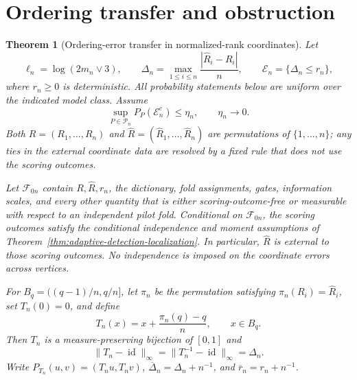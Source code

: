 \documentclass[11pt]{article}
\newtheorem{theorem}{Theorem}[section]
\theoremstyle{definition}
\newcommand{\1}{\mathbf 1}\newcommand{\op}{\operatorname}
\begin{document}
\section{Ordering transfer and obstruction}\label{sec:supp-order}


\begin{theorem}[Ordering-error transfer in normalized-rank coordinates]
\label{thm:ordering-error-transfer}
Let
\[
 \ell_n=\log(2m_n\vee3),\qquad
 \Delta_n=\max_{1\le i\le n}
 \frac{|\widehat R_i-R_i|}{n},\qquad
 \mathcal E_n=\{\Delta_n\le r_n\},
\]
where $r_n\ge0$ is deterministic.  All probability statements below
are uniform over the indicated model class.  Assume
\begin{equation}
 \sup_{P\in\mathscr P_n}P_P(\mathcal E_n^c)
 \le \eta_n,\qquad \eta_n\to0.
 \label{eq:T4-coverage}
\end{equation}
Both $R=(R_1,\ldots,R_n)$ and
$\widehat R=(\widehat R_1,\ldots,\widehat R_n)$ are permutations of
$\{1,\ldots,n\}$; any ties in the external coordinate data are
resolved by a fixed rule that does not use the scoring outcomes.

Let $\mathcal F_{0n}$ contain $R,\widehat R,r_n$, the dictionary,
fold assignments, gates, information scales, and every other quantity
that is either scoring-outcome-free or measurable with respect to an
independent pilot fold.  Conditional on
$\mathcal F_{0n}$, the scoring outcomes satisfy the conditional
independence and moment assumptions of
Theorem~\ref{thm:adaptive-detection-localization}.  In particular,
$\widehat R$ is external to those scoring outcomes.  No independence
is imposed on the coordinate errors across vertices.

For $B_q=((q-1)/n,q/n]$, let $\pi_n$ be the permutation satisfying
$\pi_n(R_i)=\widehat R_i$, set $T_n(0)=0$, and define
\begin{equation}
 T_n(x)=x+\frac{\pi_n(q)-q}{n},\qquad x\in B_q.
 \label{eq:T4-bin-map}
\end{equation}
Then $T_n$ is a measure-preserving bijection of $[0,1]$ and
\begin{equation}
 \|T_n-\operatorname{id}\|_\infty
 =\|T_n^{-1}-\operatorname{id}\|_\infty
 =\Delta_n.
 \label{eq:T4-displacement}
\end{equation}
Write $P_{T_n}(u,v)=(T_nu,T_nv)$,
$\overline\Delta_n=\Delta_n+n^{-1}$, and
$\overline r_n=r_n+n^{-1}$.


\end{theorem}
\end{document}
